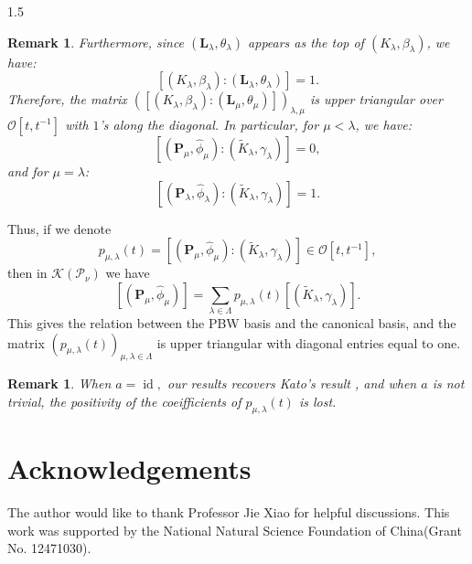 \documentclass[10pt]{amsart}
\newtheorem{remark}[theorem]{Remark}
\newcommand\mk{{\mathcal{K}}}
\begin{document}
\begin{spacing}{1.5}
\begin{remark}
    Furthermore, since $(\mathbf{L}_{\lambda}, \theta_{\lambda})$ appears as the top of $(K_{\lambda}, \beta_{\lambda})$, we have:
    \[
    [(K_{\lambda}, \beta_{\lambda}):(\mathbf{L}_{\lambda}, \theta_{\lambda})] = 1.
    \]
    Therefore, the matrix $\left( [(K_{\lambda}, \beta_{\lambda}):(\mathbf{L}_{\mu}, \theta_{\mu})] \right)_{\lambda,\mu}$ is upper triangular over $\mathcal{O}[t, t^{-1}]$ with $1$'s along the diagonal. In particular, for $\mu < \lambda$, we have:
    \[
    [(\mathbf{P}_{\mu}, \hat{\phi}_{\mu}):(\widetilde{K}_{\lambda}, \gamma_{\lambda})] = 0,
    \]
    and for $\mu = \lambda$:
    \[
    [(\mathbf{P}_{\lambda}, \hat{\phi}_{\lambda}):(\widetilde{K}_{\lambda}, \gamma_{\lambda})] = 1.
    \]
\end{remark}
Thus, if we denote
\[
p_{\mu,\lambda}(t)=[(\mathbf{P}_{\mu}, \hat{\phi}_{\mu}):(\widetilde{K}_{\lambda}, \gamma_{\lambda})]\in \mathcal{O}[t, t^{-1}],
\]
then in $\mk(\mathcal{P}_{\nu})$ we have
\[
[(\mathbf{P}_{\mu}, \hat{\phi}_{\mu})]=\sum_{\lambda\in \Lambda}p_{\mu,\lambda}(t)[(\widetilde{K}_{\lambda}, \gamma_{\lambda})].
\]
This gives the relation between the PBW basis and the canonical basis, and the matrix $(p_{\mu,\lambda}(t))_{\mu,\lambda\in \Lambda}$ is upper triangular with diagonal entries equal to one.
\begin{remark}
    When $a=\operatorname{id},$ our results recovers Kato's result \cite{cd088214-009e-3813-9a86-97f9a299a24c}, and when $a$ is not trivial, the positivity of the coeifficients of $p_{\mu,\lambda}(t)$ is lost.
\end{remark}
\section*{Acknowledgements}
The author would like to thank Professor Jie Xiao for helpful discussions. This work was supported by the National Natural Science Foundation of China(Grant No. 12471030).
\end{spacing}



\end{document}
